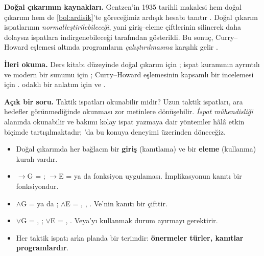 \begin{arastirmanotu}
\textbf{Doğal çıkarımın kaynakları.} Gentzen'in 1935 tarihli makalesi
hem doğal çıkarımı hem de \cref{bol:ardisik}'te göreceğimiz ardışık hesabı
tanıtır \citep{gentzen1935}. Doğal çıkarım ispatlarının
\emph{normalleştirilebileceği}, yani giriş--eleme çiftlerinin silinerek
daha dolaysız ispatlara indirgenebileceği \citet{prawitz1965} tarafından
gösterildi. Bu sonuç, Curry--Howard eşlemesi altında programların
\emph{çalıştırılmasına} karşılık gelir \citep{howard1980}.

\textbf{İleri okuma.} Ders kitabı düzeyinde doğal çıkarım için
\citet{vandalen2013}; ispat kuramının ayrıntılı ve modern bir sunumu
için \citet{troelstra2000}; Curry--Howard eşlemesinin kapsamlı bir
incelemesi için \citet{sorensen2006}. \Lean{} odaklı bir anlatım için
\citet{logicandproof} ve \citet{tpil4}.

\textbf{Açık bir soru.} Taktik ispatları okunabilir midir? Uzun taktik
ispatları, ara hedefler görünmediğinde okunması zor metinlere dönüşebilir.
\emph{İspat mühendisliği} alanında okunabilir ve bakımı kolay ispat
yazmaya dair yöntemler hâlâ etkin biçimde tartışılmaktadır;
'da bu konuya \Mathlib{} deneyimi üzerinden döneceğiz.
\end{arastirmanotu}

\begin{bolumozeti}
\begin{itemize}
  \item Doğal çıkarımda her bağlacın bir \textbf{giriş} (kanıtlama) ve bir
        \textbf{eleme} (kullanma) kuralı vardır.
  \item $\to$G = ; $\to$E =  ya da fonksiyon
        uygulaması. İmplikasyonun kanıtı bir fonksiyondur.
  \item $\wedge$G =  ya da ;
        $\wedge$E = , , . Ve'nin kanıtı bir çifttir.
  \item $\vee$G = , ; $\vee$E = ,
        . Veya'yı kullanmak durum ayırmayı gerektirir.
  \item Her taktik ispatı arka planda bir terimdir: \textbf{önermeler
        türler, kanıtlar programlardır}.
\end{itemize}
\end{bolumozeti}

